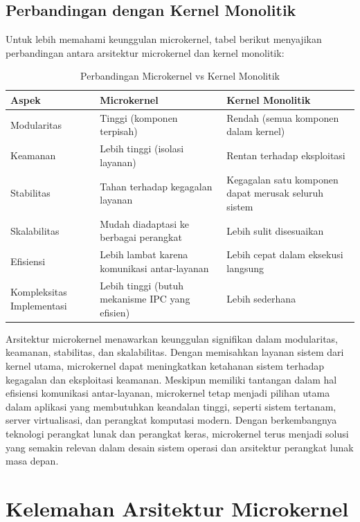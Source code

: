 \subsection{Perbandingan dengan Kernel Monolitik}

Untuk lebih memahami keunggulan microkernel, tabel berikut menyajikan perbandingan antara arsitektur microkernel dan kernel monolitik:

\begin{table}[h]
	\centering
	\renewcommand{\arraystretch}{1.3}
	\begin{tabular}{|p{}|p{}|p{}|}
		\hline
		\textbf{Aspek} & \textbf{Microkernel} & \textbf{Kernel Monolitik} \\
		\hline
		Modularitas & Tinggi (komponen terpisah) & Rendah (semua komponen dalam kernel) \\
		Keamanan & Lebih tinggi (isolasi layanan) & Rentan terhadap eksploitasi \\
		Stabilitas & Tahan terhadap kegagalan layanan & Kegagalan satu komponen dapat merusak seluruh sistem \\
		Skalabilitas & Mudah diadaptasi ke berbagai perangkat & Lebih sulit disesuaikan \\
		Efisiensi & Lebih lambat karena komunikasi antar-layanan & Lebih cepat dalam eksekusi langsung \\
		Kompleksitas Implementasi & Lebih tinggi (butuh mekanisme IPC yang efisien) & Lebih sederhana \\
		\hline
	\end{tabular}
	\caption{Perbandingan Microkernel vs Kernel Monolitik}
	\label{tab:microkernel_vs_monolithic}
\end{table}


Arsitektur microkernel menawarkan keunggulan signifikan dalam modularitas, keamanan, stabilitas, dan skalabilitas. Dengan memisahkan layanan sistem dari kernel utama, microkernel dapat meningkatkan ketahanan sistem terhadap kegagalan dan eksploitasi keamanan. Meskipun memiliki tantangan dalam hal efisiensi komunikasi antar-layanan, microkernel tetap menjadi pilihan utama dalam aplikasi yang membutuhkan keandalan tinggi, seperti sistem tertanam, server virtualisasi, dan perangkat komputasi modern. Dengan berkembangnya teknologi perangkat lunak dan perangkat keras, microkernel terus menjadi solusi yang semakin relevan dalam desain sistem operasi dan arsitektur perangkat lunak masa depan.


\section{Kelemahan Arsitektur Microkernel}

